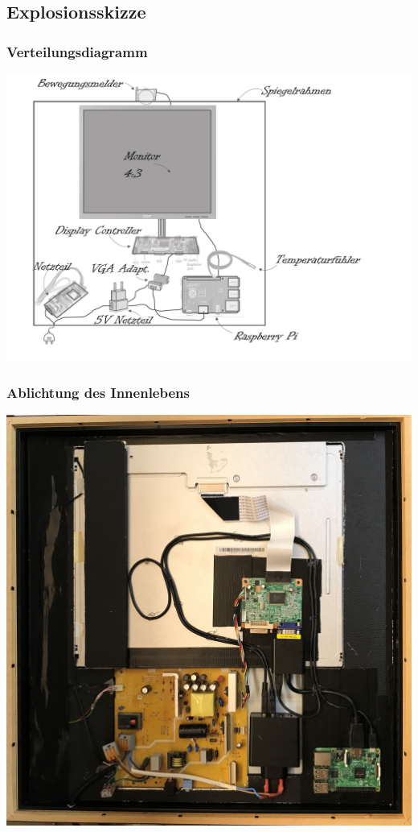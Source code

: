 \documentclass[11pt]{beamer}
\begin{document}
	\subsection{Explosionsskizze}
	\begin{frame}
		\frametitle{Verteilungsdiagramm}
		\includegraphics[scale = 0.4]{images/smartMirrorExplosionsskizze.pdf}
	\end{frame}
	\begin{frame}
		\frametitle{Ablichtung des Innenlebens}
		\begin{center}
			\includegraphics[scale= 0.07]{images/20170624_114852514_iOS.jpg}		
		\end{center}
	\end{frame}
\end{document}
